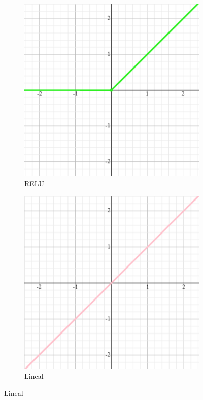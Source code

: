  \begin{figure}[!ht]
        \centering
        \begin{subfigure}{0.45\textwidth}
            \centering
            \includegraphics[width=\textwidth]{img/RELU.png}
            \caption{RELU}
            \label{fig:funcionRELU}
        \end{subfigure}
        \begin{subfigure}{0.45\textwidth}
            \centering
            \includegraphics[width=\textwidth]{img/lineal.png}
            \caption{Lineal}
            \label{fig:funcionLineal}
        \end{subfigure}


\end{figure}
